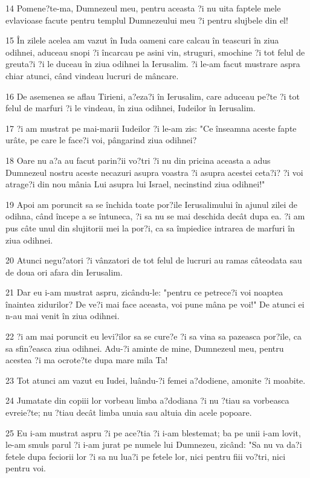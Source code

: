 \par 14 Pomene?te-ma, Dumnezeul meu, pentru aceasta ?i nu uita faptele mele evlavioase facute pentru templul Dumnezeului meu ?i pentru slujbele din el!
\par 15 În zilele acelea am vazut în Iuda oameni care calcau în teascuri în ziua odihnei, aduceau snopi ?i încarcau pe asini vin, struguri, smochine ?i tot felul de greuta?i ?i le duceau în ziua odihnei la Ierusalim. ?i le-am facut mustrare aspra chiar atunci, când vindeau lucruri de mâncare.
\par 16 De asemenea se aflau Tirieni, a?eza?i în Ierusalim, care aduceau pe?te ?i tot felul de marfuri ?i le vindeau, în ziua odihnei, Iudeilor în Ierusalim.
\par 17 ?i am mustrat pe mai-marii Iudeilor ?i le-am zis: "Ce înseamna aceste fapte urâte, pe care le face?i voi, pângarind ziua odihnei?
\par 18 Oare nu a?a au facut parin?ii vo?tri ?i nu din pricina aceasta a adus Dumnezeul nostru aceste necazuri asupra voastra ?i asupra acestei ceta?i? ?i voi atrage?i din nou mânia Lui asupra lui Israel, necinstind ziua odihnei!"
\par 19 Apoi am poruncit sa se închida toate por?ile Ierusalimului în ajunul zilei de odihna, când începe a se întuneca, ?i sa nu se mai deschida decât dupa ea. ?i am pus câte unul din slujitorii mei la por?i, ca sa împiedice intrarea de marfuri în ziua odihnei.
\par 20 Atunci negu?atori ?i vânzatori de tot felul de lucruri au ramas câteodata sau de doua ori afara din Ierusalim.
\par 21 Dar eu i-am mustrat aspru, zicându-le: "pentru ce petrece?i voi noaptea înaintea zidurilor? De ve?i mai face aceasta, voi pune mâna pe voi!" De atunci ei n-au mai venit în ziua odihnei.
\par 22 ?i am mai poruncit eu levi?ilor sa se cure?e ?i sa vina sa pazeasca por?ile, ca sa sfin?easca ziua odihnei. Adu-?i aminte de mine, Dumnezeul meu, pentru acestea ?i ma ocrote?te dupa mare mila Ta!
\par 23 Tot atunci am vazut eu Iudei, luându-?i femei a?dodiene, amonite ?i moabite.
\par 24 Jumatate din copiii lor vorbeau limba a?dodiana ?i nu ?tiau sa vorbeasca evreie?te; nu ?tiau decât limba unuia sau altuia din acele popoare.
\par 25 Eu i-am mustrat aspru ?i pe ace?tia ?i i-am blestemat; ba pe unii i-am lovit, le-am smuls parul ?i i-am jurat pe numele lui Dumnezeu, zicând: "Sa nu va da?i fetele dupa feciorii lor ?i sa nu lua?i pe fetele lor, nici pentru fiii vo?tri, nici pentru voi.
